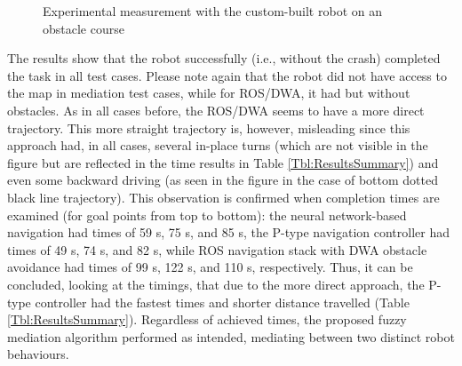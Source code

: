 \begin{figure}
\centering
{}
\hfill
{}
\caption{Experimental measurement with the custom-built robot on an obstacle course}
\label{Fig:paletarTesting}
\end{figure}

The results show that the robot successfully (i.e., without the crash) completed the task in all test cases. Please note again that the robot did not have access to the map in mediation test cases, while for ROS/DWA, it had but without obstacles. As in all cases before, the ROS/DWA seems to have a more direct trajectory. This more straight trajectory is, however, misleading since this approach had, in all cases, several in-place turns (which are not visible in the figure but are reflected in the time results in Table \ref{Tbl:ResultsSummary}) and even some backward driving (as seen in the figure in the case of bottom dotted black line trajectory). This observation is confirmed when completion times are examined (for goal points from top to bottom): the neural network-based navigation had times of 59 s, 75 s, and 85 s, the P-type navigation controller had times of 49 s, 74 s, and 82 s, while ROS navigation stack with DWA obstacle avoidance had times of 99 s, 122 s, and 110 s, respectively. Thus, it can be concluded, looking at the timings, that due to the more direct approach, the P-type controller had the fastest times and shorter distance travelled (Table \ref{Tbl:ResultsSummary}). Regardless of achieved times, the proposed fuzzy mediation algorithm performed as intended, mediating between two distinct robot behaviours. 

